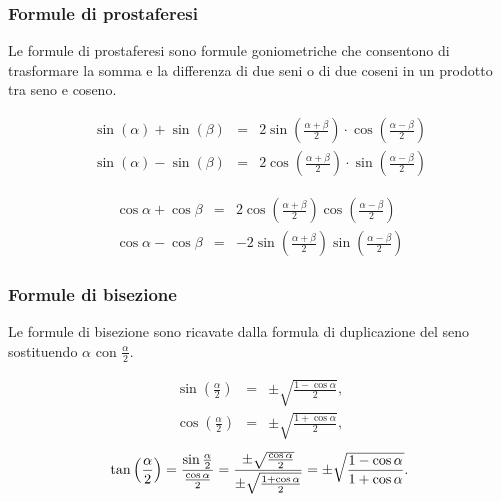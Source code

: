\subsubsection{Formule di prostaferesi}
Le formule di prostaferesi sono formule goniometriche che consentono di trasformare la somma e la differenza di due seni o di due coseni in un prodotto tra seno e coseno.
\begin{definition}
    \begin{equation*}
        \begin{matrix}
            \sin(\alpha)+\sin(\beta) &=& 2 \sin\left(\frac{\alpha+\beta}{2}\right)\cdot\cos \left(\frac{\alpha-\beta}{2}\right)\\
            \sin(\alpha)-\sin(\beta) &=& 2 \cos\left(\frac{\alpha+\beta}{2}\right)\cdot\sin \left(\frac{\alpha-\beta}{2}\right)
        \end{matrix}
    \end{equation*}
\end{definition}

\begin{definition}
    \begin{equation*}
        \begin{matrix}
            \cos\alpha+\cos\beta &=& 2\cos\left(\frac{\alpha+\beta}{2}\right)\cos\left(\frac{\alpha -\beta}{2}\right)\\
            \cos\alpha-\cos\beta &=& -2\sin\left(\frac{\alpha+\beta}{2}\right)\sin\left(\frac{\alpha -\beta}{2}\right)
        \end{matrix}
    \end{equation*}
\end{definition}

\subsubsection{Formule di bisezione}
Le formule di bisezione sono ricavate dalla formula di duplicazione del seno sostituendo $\alpha$ con $\frac{\alpha}{2}$.

\begin{definition}
    \begin{equation*}
        \begin{matrix}
            \sin\left(\frac{\alpha}{2}\right)&=&\pm\sqrt{\frac{1-\cos\alpha}{2}},\\
            \cos\left(\frac{\alpha}{2}\right)&=&\pm\sqrt{\frac{1+\cos\alpha}{2}},
        \end{matrix}
    \end{equation*}
    \begin{equation*}
        \tan\left(\frac{\alpha}{2}\right)=\frac{\sin\frac{\alpha}{2}}{\frac{\cos\alpha}{2}}=\frac{\pm\sqrt{\frac{\-\cos\alpha}{2}}}{\pm\sqrt{\frac{1+\cos\alpha}{2}}}=\pm\sqrt{\frac{1-\cos\alpha}{1+\cos\alpha}}.
    \end{equation*}
\end{definition}

